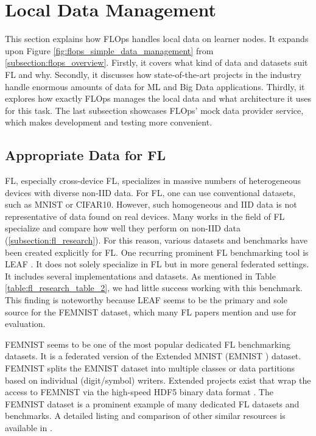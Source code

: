 \section{Local Data Management}

This section explains how FLOps handles local data on learner nodes.
It expands upon Figure \ref{fig:flops_simple_data_management} from \ref{subsection:flops_overview}.
Firstly, it covers what kind of data and datasets suit FL and why.
Secondly, it discusses how state-of-the-art projects in the industry handle enormous amounts of data for ML and Big Data applications.
Thirdly, it explores how exactly FLOps manages the local data and what architecture it uses for this task.
The last subsection showcases FLOps' mock data provider service, which makes development and testing more convenient.

\subsection{Appropriate Data for FL}

FL, especially cross-device FL, specializes in massive numbers of heterogeneous devices with diverse non-IID data.
For FL, one can use conventional datasets, such as MNIST or CIFAR10.
However, such homogeneous and IID data is not representative of data found on real devices.
Many works in the field of FL specialize and compare how well they perform on non-IID data (\ref{subsection:fl_research}).
For this reason, various datasets and benchmarks have been created explicitly for FL.
One recurring prominent FL benchmarking tool is LEAF \cite{paper:leaf_fl_benchmark}.
It does not solely specialize in FL but in more general federated settings.
It includes several implementations and datasets.
As mentioned in Table \ref{table:fl_research_table_2}, we had little success working with this benchmark.
This finding is noteworthy because LEAF seems to be the primary and sole source for the FEMNIST dataset, which many FL papers mention and use for evaluation.

FEMNIST seems to be one of the most popular dedicated FL benchmarking datasets.
It is a federated version of the Extended MNIST (EMNIST \cite{emnist_dataset}) dataset.
FEMNIST splits the EMNIST dataset into multiple classes or data partitions based on individual (digit/symbol) writers.
Extended projects exist that wrap the access to FEMNIST via the high-speed HDF5 binary data format \cite{hdf5_femnist}.
The FEMNIST dataset is a prominent example of many dedicated FL datasets and benchmarks.
A detailed listing and comparison of other similar resources is available in \cite{thesis:tum_fl_framework_comparison}.

